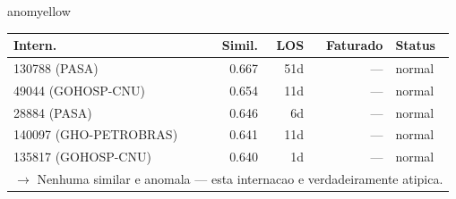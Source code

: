 \documentclass[a4paper,10pt]{article}
\begin{document}
\begin{anomalycard}[Internacao 165440 | GHO-PETROBRAS | MODERADO (z=2.98)]{anomyellow}
\begin{tabular}{l r r r l}\toprule\textbf{Intern.} & \textbf{Simil.} & \textbf{LOS} & \textbf{Faturado} & \textbf{Status} \\\midrule
130788 (PASA) & 0.667 & 51d & --- & \textcolor{jcubeblue}{normal} \\
49044 (GOHOSP-CNU) & 0.654 & 11d & --- & \textcolor{jcubeblue}{normal} \\
28884 (PASA) & 0.646 & 6d & --- & \textcolor{jcubeblue}{normal} \\
140097 (GHO-PETROBRAS) & 0.641 & 11d & --- & \textcolor{jcubeblue}{normal} \\
135817 (GOHOSP-CNU) & 0.640 & 1d & --- & \textcolor{jcubeblue}{normal} \\
\multicolumn{5}{l}{\textcolor{jcubeblue}{\small $\rightarrow$ Nenhuma similar e anomala --- esta internacao e verdadeiramente atipica.}} \\
\bottomrule\end{tabular}


\end{anomalycard}

\newpage
\end{document}

